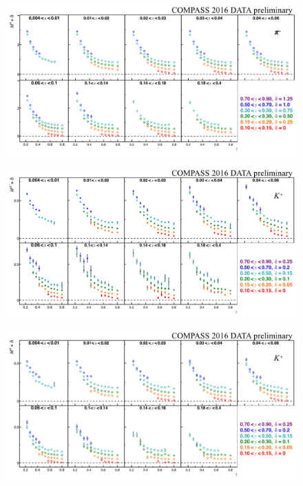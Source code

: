 \documentclass[letterpaper,12pt]{article}
\begin{document}
\begin{figure}
	\includegraphics[scale=0.5]{./gfx/Pim.png}
	\caption{}
	\label{Pim}
\end{figure}

\begin{figure}
	\includegraphics[scale=0.5]{./gfx/Kp.png}
	\caption{}
	\label{Kp}
\end{figure}

\newpage

\begin{figure}
	\includegraphics[scale=0.5]{./gfx/Km.png}
	\caption{}
	\label{Km}
\end{figure}
\end{document}
